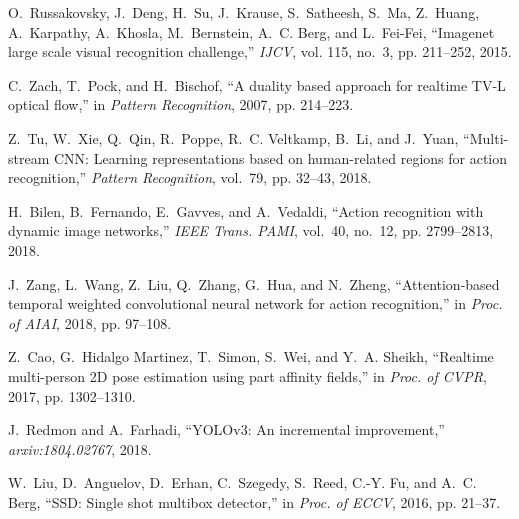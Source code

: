 \documentclass[journal]{IEEEtran}
\begin{document}
\begin{thebibliography}{10}
	O.~Russakovsky, J.~Deng, H.~Su, J.~Krause, S.~Satheesh, S.~Ma, Z.~Huang,
	A.~Karpathy, A.~Khosla, M.~Bernstein, A.~C. Berg, and L.~Fei-Fei, ``Imagenet
	large scale visual recognition challenge,'' \emph{IJCV}, vol. 115, no.~3, pp.
	211--252, 2015.
	
	C.~Zach, T.~Pock, and H.~Bischof, ``A duality based approach for realtime
	{TV-L} optical flow,'' in \emph{Pattern Recognition}, 2007, pp. 214--223.
	
	Z.~Tu, W.~Xie, Q.~Qin, R.~Poppe, R.~C. Veltkamp, B.~Li, and J.~Yuan,
	``Multi-stream {CNN}: Learning representations based on human-related regions
	for action recognition,'' \emph{Pattern Recognition}, vol.~79, pp. 32--43,
	2018.
	
	H.~{Bilen}, B.~{Fernando}, E.~{Gavves}, and A.~{Vedaldi}, ``Action recognition
	with dynamic image networks,'' \emph{IEEE Trans. PAMI}, vol.~40, no.~12, pp.
	2799--2813, 2018.
	
	J.~Zang, L.~Wang, Z.~Liu, Q.~Zhang, G.~Hua, and N.~Zheng, ``Attention-based
	temporal weighted convolutional neural network for action recognition,'' in
	\emph{Proc. of AIAI}, 2018, pp. 97--108.
	
	Z.~{Cao}, G.~{Hidalgo Martinez}, T.~{Simon}, S.~{Wei}, and Y.~A. {Sheikh},
	``Realtime multi-person {2D} pose estimation using part affinity fields,'' in
	\emph{Proc. of CVPR}, 2017, pp. 1302--1310.
	
	J.~Redmon and A.~Farhadi, ``{YOLO}v3: An incremental improvement,''
	\emph{arxiv:1804.02767}, 2018.
	
	W.~Liu, D.~Anguelov, D.~Erhan, C.~Szegedy, S.~Reed, C.-Y. Fu, and A.~C. Berg,
	``{SSD}: Single shot multibox detector,'' in \emph{Proc. of ECCV}, 2016, pp.
	21--37.
	
\end{thebibliography}
\end{document}
